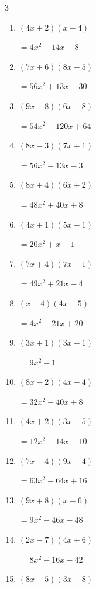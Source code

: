 \begin{multicols}{3}
\begin{enumerate}
        $=56x^{2}-98x+42$

\columnbreak %

  \item $(4x+2)(x-4)$

        $=4x^{2}-14x-8$

  \item $(7x+6)(8x-5)$

        $=56x^{2}+13x-30$

  \item $(9x-8)(6x-8)$

        $=54x^{2}-120x+64$

  \item $(8x-3)(7x+1)$

        $=56x^{2}-13x-3$

  \item $(8x+4)(6x+2)$

        $=48x^{2}+40x+8$

  \item $(4x+1)(5x-1)$

        $=20x^{2}+x-1$

  \item $(7x+4)(7x-1)$

        $=49x^{2}+21x-4$

  \item $(x-4)(4x-5)$

        $=4x^{2}-21x+20$

  \item $(3x+1)(3x-1)$

        $=9x^{2}-1$

  \item $(8x-2)(4x-4)$

        $=32x^{2}-40x+8$

  \item $(4x+2)(3x-5)$

        $=12x^{2}-14x-10$

  \item $(7x-4)(9x-4)$

        $=63x^{2}-64x+16$

  \item $(9x+8)(x-6)$

        $=9x^{2}-46x-48$

  \item $(2x-7)(4x+6)$

        $=8x^{2}-16x-42$

  \item $(8x-5)(3x-8)$


\end{enumerate}
\end{multicols}
